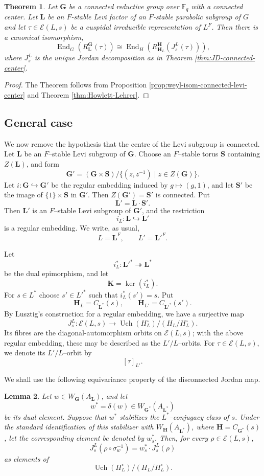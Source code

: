 \documentclass{amsart}
\theoremstyle{plain}
\numberwithin{equation}{section}
\newtheorem{theorem}{Theorem}[section]
\newtheorem{lemma}[theorem]{Lemma}
\theoremstyle{definition}
\newcommand{\cE}{\mathcal{E}}
\newcommand{\End}{\operatorname{End}}
\newcommand{\fq}{\mathbb{F}_{q}}
\newcommand{\Uch}{\operatorname{Uch}}
\newcommand{\bG}{\mathbf{G}}
\newcommand{\bL}{\mathbf{L}}
\newcommand{\bH}{\mathbf{H}}
\newcommand{\bK}{\mathbf{K}}
\newcommand{\bS}{\mathbf{S}}
\begin{document}
\begin{theorem}\label{thm:HC-endo-match-connected-centre}
Let $\bG$ be a connected reductive group over $\fq$ with a connected center.
Let $\bL$ be an $F$-stable Levi factor of an $F$-stable parabolic subgroup of $G$ and
let $\tau\in \cE(L,s)$ be a cuspidal irreducible representation of $L^F$.
Then there is a canonical isomorphism, $$\End_{G}(R_{\bL}^{\bG}(\tau))\cong\End_{H}(R_{\bH_L}^{\bH}(J_s^L(\tau))),$$
where $J_s^L$ is the unique Jordan decomposition as in Theorem \ref{thm:JD-connected-center}.
\end{theorem}
\begin{proof}
The Theorem follows from Proposition \ref{prop:weyl-isom-connected-levi-center} and Theorem \ref{thm:Howlett-Lehrer}.
\end{proof}
\subsection{General case}

We now remove the hypothesis that the centre of the Levi subgroup is connected.
Let $\bL$ be an $F$--stable Levi subgroup of $\bG$.  Choose an $F$--stable
torus $\bS$ containing $Z(\bL)$, and form
\[
\bG'=(\bG\times \bS)/\{(z,z^{-1})\mid z\in Z(\bG)\}.
\]
Let $i:\bG\hookrightarrow \bG'$ be the regular embedding induced by
$g\mapsto (g,1)$, and let $\bS'$ be the image of $\{1\}\times \bS$ in
$\bG'$.  Then $Z(\bG')=\bS'$ is connected.  Put
\[
\bL'=\bL\cdot \bS'.
\]
Then $\bL'$ is an $F$--stable Levi subgroup of $\bG'$, and the restriction
\[
i_L:\bL\hookrightarrow \bL'
\]
is a regular embedding.  We write, as usual,
\[
L=\bL^F,\qquad L'=\bL'^F.
\]

Let
\[
i_L^*:\bL'^*\twoheadrightarrow \bL^*
\]
be the dual epimorphism, and let
\[
\bK=\ker(i_L^*).
\]
For $s\in L^*$ choose $s'\in L'^*$ such that $i_L^*(s')=s$.  Put
\[
\bH_L=C_{\bL^*}(s),\qquad
\bH_{L'}=C_{\bL'^*}(s').
\]
By Lusztig's construction for a regular embedding, we have a surjective map
\[
J_s^L:\mathcal E(L,s)\longrightarrow
\Uch(H_L^\circ)/(H_L/H_L^\circ).
\]
Its fibres are the diagonal-automorphism orbits on $\mathcal E(L,s)$; with
the above regular embedding, these may be described as the $L'/L$--orbits.
For $\tau\in\mathcal E(L,s)$, we denote its $L'/L$--orbit by
\[
[\tau]_{L'}.
\]

We shall use the following equivariance property of the disconnected Jordan
map.

\begin{lemma}\label{lem:disconnected-JD-Weyl-equivariance}
Let $w\in W_{\bG}(A_{\bL})$, and let
\[
w^*=\delta(w)\in W_{\bG^*}(A_{\bL^*})
\]
be its dual element.  Suppose that $w^*$ stabilizes the $L^*$--conjugacy
class of $s$.  Under the standard identification of this stabilizer with
$W_{\bH}(A_{\bL^*})$, where $\bH=C_{\bG^*}(s)$, let the corresponding element
be denoted by $w_s^*$.  Then, for every $\rho\in\mathcal E(L,s)$,
\[
J_s^L(\rho\circ\sigma_w^{-1})
=
w_s^*\cdot J_s^L(\rho)
\]
as elements of
\[
\Uch(H_L^\circ)/(H_L/H_L^\circ).
\]
\end{lemma}
\end{document}
